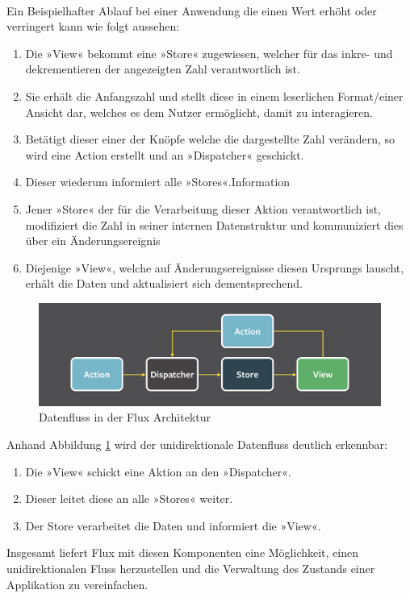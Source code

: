 \\
Ein Beispielhafter Ablauf bei einer Anwendung die einen Wert erhöht oder verringert kann wie folgt aussehen:
\begin{enumerate}
	\item Die »View« bekommt eine »Store« zugewiesen, welcher für das inkre- und dekrementieren der angezeigten Zahl verantwortlich ist.
	\item Sie erhält die Anfangszahl und stellt diese in einem leserlichen Format/einer Ansicht dar, welches es dem Nutzer ermöglicht, damit zu interagieren.
	\item Betätigt dieser einer der Knöpfe welche die dargestellte Zahl verändern, so wird eine Action erstellt und an »Dispatcher« geschickt.
	\item Dieser wiederum informiert alle »Stores«.Information
	\item Jener »Store« der für die Verarbeitung dieser Aktion verantwortlich ist, modifiziert die Zahl in seiner internen Datenstruktur und kommuniziert dies über ein Änderungsereignis
	\item Diejenige »View«, welche auf Änderungsereignisse diesen Ursprungs lauscht, erhält die Daten und aktualisiert sich dementsprechend. 
\end{enumerate}

\begin{figure}[ht]
	\centering
	\includegraphics[height=0.25\textwidth]{./images/flux-flow}
	\caption{Datenfluss in der Flux Architektur}
	\label{fig:datenflussFlux}
\end{figure}

Anhand Abbildung \ref{fig:datenflussFlux} wird der unidirektionale Datenfluss deutlich erkennbar:
\begin{enumerate}
	\item Die »View« schickt eine Aktion an den »Dispatcher«.
	\item Dieser leitet diese an alle »Stores« weiter.
	\item Der Store verarbeitet die Daten und informiert die »View«.
\end{enumerate}
\bigskip
Insgesamt liefert Flux mit diesen Komponenten eine Möglichkeit, einen unidirektionalen Fluss herzustellen und die Verwaltung des Zustands einer Applikation zu vereinfachen.
